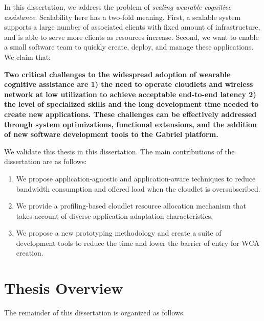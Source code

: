 In this dissertation, we address the problem of \textit{scaling wearable
cognitive assistance}. Scalability here has a two-fold meaning. First, a
scalable system supports a large number of associated clients with fixed amount
of infrastructure, and is able to serve more clients as resources increase.
Second, we want to enable a small software team to quickly create, deploy, and
manage these applications. We claim that:

\textbf{Two critical challenges to the widespread adoption of wearable cognitive
  assistance are 1) the need to operate cloudlets and wireless network at low
  utilization to achieve acceptable end-to-end latency 2) the level of specialized
  skills and the long development time needed to create new applications. These
  challenges can be effectively addressed through system optimizations,
  functional extensions, and the addition of new software development tools to
  the Gabriel platform.}


We validate this thesis in this dissertation. The main contributions of the
dissertation are as follows:
\begin{enumerate}
  \item{We propose application-agnostic and application-aware techniques to
  reduce bandwidth consumption and offered load when the cloudlet is
  oversubscribed.}
  \item{We provide a profiling-based cloudlet resource allocation mechanism that
  takes account of diverse application adaptation characteristics.}
  \item{We propose a new prototyping methodology and create a suite of
  development tools to reduce the time and lower the barrier of entry for WCA
  creation.}
\end{enumerate}

\section{Thesis Overview}

The remainder of this dissertation is organized as follows.


